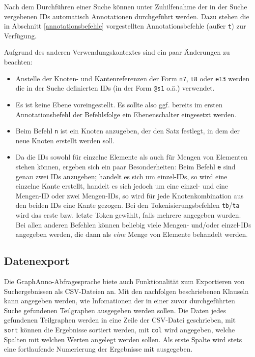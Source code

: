 \documentclass[12pt]{scrartcl}
\begin{document}
Nach dem Durchführen einer Suche können unter Zuhilfenahme der in der Suche vergebenen IDs automatisch Annotationen durchgeführt werden. Dazu stehen die in Abschnitt \ref{annotationsbefehle} vorgestellten Annotationsbefehle (außer \texttt{t}) zur Verfügung.

Aufgrund des anderen Verwendungskontextes sind ein paar Änderungen zu beachten:
\begin{itemize}
	\item Anstelle der Knoten- und Kantenreferenzen der Form \texttt{n7}, \texttt{t8} oder \texttt{e13} werden die in der Suche definierten IDs (in der Form \texttt{@s1} o.ä.) verwendet. 
	\item Es ist keine Ebene voreingestellt. Es sollte also ggf. bereits im ersten Annotationsbefehl der Befehlsfolge ein Ebenenschalter eingesetzt werden.
	\item Beim Befehl \texttt{n} ist ein Knoten anzugeben, der den Satz festlegt, in dem der neue Knoten erstellt werden soll.
	\item Da die IDs sowohl für einzelne Elemente als auch für Mengen von Elementen stehen können, ergeben sich ein paar Besonderheiten: Beim Befehl \texttt{e} sind genau zwei IDs anzugeben; handelt es sich um einzel-IDs, so wird eine einzelne Kante erstellt, handelt es sich jedoch um eine einzel- und eine Mengen-ID oder zwei Mengen-IDs, so wird für jede Knotenkombination aus den beiden IDs eine Kante gezogen. Bei den Tokenisierungsbefehlen \texttt{tb}/\texttt{ta} wird das erste bzw. letzte Token gewählt, falls mehrere angegeben wurden. Bei allen anderen Befehlen können beliebig viele Mengen- und/oder einzel-IDs angegeben werden, die dann als \textit{eine} Menge von Elemente behandelt werden.
\end{itemize}



\subsection{Datenexport}

Die GraphAnno-Abfragesprache biete auch Funktionalität zum Exportieren von Suchergebnissen als CSV-Dateien an. 
Mit den nachfolgen beschriebenen Klauseln kann angegeben werden, wie Infomationen der in einer zuvor durchgeführten Suche gefundenen Teilgraphen ausgegeben werden sollen.
Die Daten jedes gefundenen Teilgraphen werden in eine Zeile der CSV-Datei geschrieben, mit \texttt{sort} können die Ergebnisse sortiert werden, mit \texttt{col} wird angegeben, welche Spalten mit welchen Werten angelegt werden sollen. Als erste Spalte wird stets eine fortlaufende Numerierung der Ergebnisse mit ausgegeben.
\end{document}
